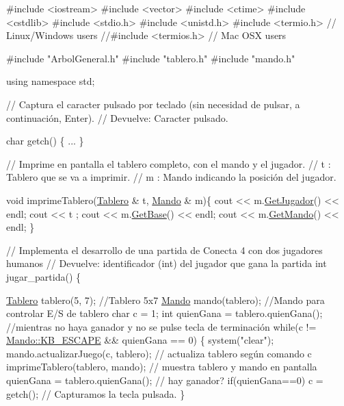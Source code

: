 \begin{DoxyCode}
\textcolor{preprocessor}{#include <iostream>}
\textcolor{preprocessor}{#include <vector>}
\textcolor{preprocessor}{#include <ctime>}
\textcolor{preprocessor}{#include <cstdlib>}
\textcolor{preprocessor}{#include <stdio.h>}
\textcolor{preprocessor}{#include <unistd.h>}
\textcolor{preprocessor}{#include <termio.h>}         \textcolor{comment}{// Linux/Windows users}
\textcolor{comment}{//#include <termios.h>      // Mac OSX users}

\textcolor{preprocessor}{#include "ArbolGeneral.h"}
\textcolor{preprocessor}{#include "tablero.h"}
\textcolor{preprocessor}{#include "mando.h"}

\textcolor{keyword}{using namespace }std;

\textcolor{comment}{// Captura el caracter pulsado por teclado (sin necesidad de pulsar, a continuación, Enter).}
\textcolor{comment}{// Devuelve: Caracter pulsado.}

\textcolor{keywordtype}{char} getch() \{
 ...
\}

\textcolor{comment}{// Imprime en pantalla el tablero completo, con el mando y el jugador.}
\textcolor{comment}{// t : Tablero que se va a imprimir.}
\textcolor{comment}{// m : Mando indicando la posición del jugador.}

\textcolor{keywordtype}{void} imprimeTablero(\hyperlink{classTablero}{Tablero} & t, \hyperlink{classMando}{Mando} & m)\{
    cout << m.\hyperlink{classMando_aaf8c918ecbce5c8173fcf40e04c8b0b7}{GetJugador}() << endl;
    cout << t ;
    cout << m.\hyperlink{classMando_abcc813b0881e56ed976eea2ce6b7fd12}{GetBase}() << endl;
    cout << m.\hyperlink{classMando_a7e02a04343208f949a88e720ba63a281}{GetMando}() << endl;
\}


\textcolor{comment}{// Implementa el desarrollo de una partida de Conecta 4 con dos jugadores humanos}
\textcolor{comment}{// Devuelve: identificador (int) del jugador que gana la partida}
\textcolor{keywordtype}{int} jugar\_partida() \{

    \hyperlink{classTablero}{Tablero} tablero(5, 7);      \textcolor{comment}{//Tablero 5x7}
    \hyperlink{classMando}{Mando} mando(tablero);       \textcolor{comment}{//Mando para controlar E/S de tablero}
    \textcolor{keywordtype}{char} c = 1;
    \textcolor{keywordtype}{int} quienGana = tablero.quienGana();
    \textcolor{comment}{//mientras no haya ganador y no se pulse tecla de terminación}
    \textcolor{keywordflow}{while}(c != \hyperlink{classMando_a3c4e7465d5b25fcaf8f3b50b444421a3}{Mando::KB\_ESCAPE} && quienGana == 0) \{
        system(\textcolor{stringliteral}{"clear"});
        mando.actualizarJuego(c, tablero);  \textcolor{comment}{// actualiza tablero según comando c }
        imprimeTablero(tablero, mando);     \textcolor{comment}{// muestra tablero y mando en pantalla}
        quienGana = tablero.quienGana();    \textcolor{comment}{// hay ganador?}
        \textcolor{keywordflow}{if}(quienGana==0) c = getch();       \textcolor{comment}{// Capturamos la tecla pulsada.    }
    \}


\end{DoxyCode}
